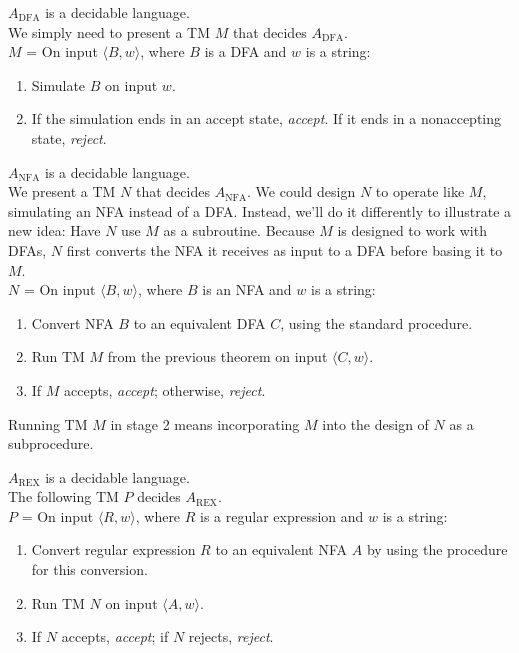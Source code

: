 \documentclass{article}
\begin{document}
\begin{theorem}
  $A_{\textrm{DFA}}$ is a decidable language. \\ 

  We simply need to present a TM $M$ that decides $A_{\textrm{DFA}}$. \\ 
  $M$ = On input $\langle B,w \rangle$, where $B$ is a DFA and $w$ is a string:
  \begin{enumerate}
    \item Simulate $B$ on input $w$. 
    \item If the simulation ends in an accept state, \emph{accept}. If it ends in a nonaccepting state, \emph{reject}.
  \end{enumerate}
\end{theorem}

\begin{theorem}
  $A_{\textrm{NFA}}$ is a decidable language. \\ 

  We present a TM $N$ that decides $A_{\textrm{NFA}}$. We could design $N$ to operate like $M$, simulating an NFA instead of a DFA. Instead, we'll do it differently to illustrate a new idea: Have $N$ use $M$ as a subroutine. Because $M$ is designed to work with DFAs, $N$ first converts the NFA it receives as input to a DFA before basing it to $M$. \\ 
  $N$ = On input $\langle B , w \rangle$, where $B$ is an NFA and $w$ is a string: 
  \begin{enumerate}
    \item Convert NFA $B$ to an equivalent DFA $C$, using the standard procedure. 
    \item Run TM $M$ from the previous theorem on input $\langle C,w \rangle$. 
    \item If $M$ accepts, \emph{accept}; otherwise, \emph{reject}. 
  \end{enumerate}
  Running TM $M$ in stage 2 means incorporating $M$ into the design of $N$ as a subprocedure. 
\end{theorem}

\begin{theorem}
  $A_{\textrm{REX}}$ is a decidable language. \\ 

  The following TM $P$ decides $A_{\textrm{REX}}$. \\ 
  $P$ = On input $\langle R,w \rangle$, where $R$ is a regular expression and $w$ is a string: 
  \begin{enumerate}
    \item Convert regular expression $R$ to an equivalent NFA $A$ by using the procedure for this conversion. 
    \item Run TM $N$ on input $\langle A,w \rangle$. 
    \item If $N$ accepts, \emph{accept}; if $N$ rejects, \emph{reject}. 
  \end{enumerate}
\end{theorem}
\end{document}
